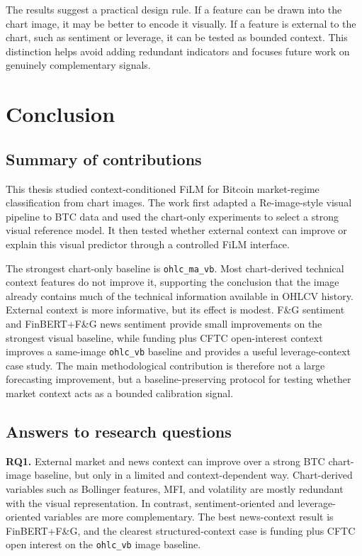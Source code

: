 \documentclass[14pt,a4paper]{extarticle}
\newcommand{\code}[1]{\texttt{#1}}
\begin{document}
The results suggest a practical design rule. If a feature can be drawn into the chart image, it may be better to encode it visually. If a feature is external to the chart, such as sentiment or leverage, it can be tested as bounded context. This distinction helps avoid adding redundant indicators and focuses future work on genuinely complementary signals.

\clearpage

\section{Conclusion}

\subsection{Summary of contributions}

This thesis studied context-conditioned FiLM for Bitcoin market-regime classification from chart images. The work first adapted a Re-image-style visual pipeline to BTC data and used the chart-only experiments to select a strong visual reference model. It then tested whether external context can improve or explain this visual predictor through a controlled FiLM interface.

The strongest chart-only baseline is \code{ohlc\_ma\_vb}. Most chart-derived technical context features do not improve it, supporting the conclusion that the image already contains much of the technical information available in OHLCV history. External context is more informative, but its effect is modest. F\&G sentiment and FinBERT+F\&G news sentiment provide small improvements on the strongest visual baseline, while funding plus CFTC open-interest context improves a same-image \code{ohlc\_vb} baseline and provides a useful leverage-context case study. The main methodological contribution is therefore not a large forecasting improvement, but a baseline-preserving protocol for testing whether market context acts as a bounded calibration signal.

\subsection{Answers to research questions}

\textbf{RQ1.} External market and news context can improve over a strong BTC chart-image baseline, but only in a limited and context-dependent way. Chart-derived variables such as Bollinger features, MFI, and volatility are mostly redundant with the visual representation. In contrast, sentiment-oriented and leverage-oriented variables are more complementary. The best news-context result is FinBERT+F\&G, and the clearest structured-context case is funding plus CFTC open interest on the \code{ohlc\_vb} image baseline.
\end{document}

